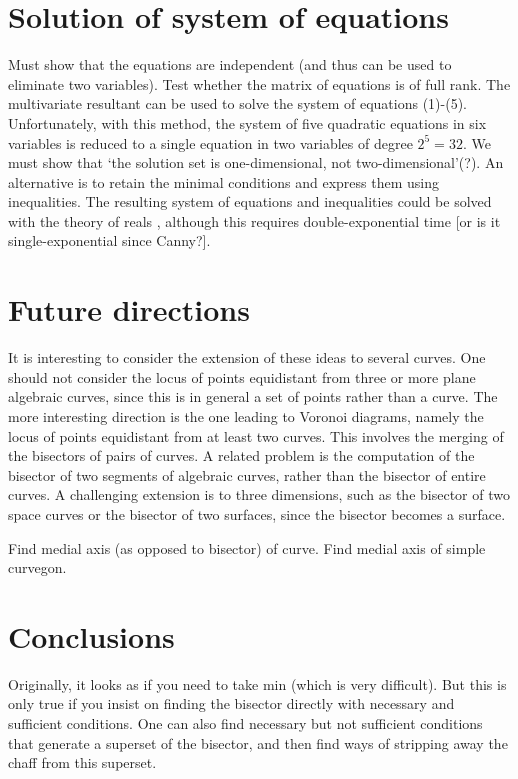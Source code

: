 \section{Solution of system of equations}
\label{sec-system-soln}

Must show that the equations are independent (and thus can be used to eliminate two
variables).
Test whether the matrix of equations is of full rank.
%
The multivariate resultant \cite{} can be used to solve the system of equations (1)-(5).
Unfortunately, with this method, the system of five quadratic equations in six 
variables is reduced to a single equation in two variables of degree $2^{5} = 32$.
We must show that `the solution set is one-dimensional, not two-dimensional'(?).
An alternative is to retain the minimal conditions and express them using inequalities.
The resulting system of equations and inequalities could be solved with the theory of
reals \cite{}, although this requires double-exponential time [or is it single-exponential
since Canny?].

\section{Future directions}

It is interesting to consider the extension of these ideas to several curves.
One should not consider the locus of points equidistant from three or more plane algebraic 
curves, since this is in general a set of points rather than a curve.
The more interesting direction is the one leading to Voronoi diagrams, namely
the locus of points equidistant from at least two curves.
This involves the merging of the bisectors of pairs of curves.
A related problem is the computation of the bisector of two segments of algebraic curves,
rather than the bisector of entire curves.
A challenging extension is to three dimensions, such as the bisector of two space 
curves or the bisector of two surfaces, since the bisector becomes a surface.

Find medial axis (as opposed to bisector) of curve.
Find medial axis of simple curvegon.

\section{Conclusions}

Originally, it looks as if you need to take min (which is very difficult).
But this is only true if you insist on finding the bisector directly with
necessary and sufficient conditions.
One can also find necessary but not sufficient conditions 
that generate a superset of the bisector, and then find ways of stripping away
the chaff from this superset.


